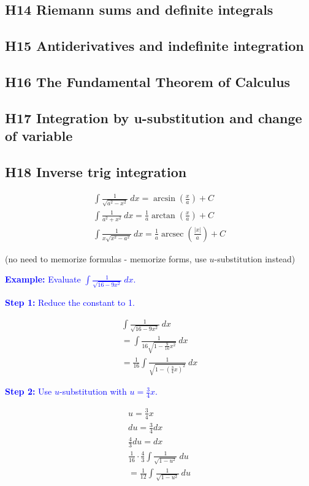 \documentclass[letterpaper, 12pt]{article}
\DeclareMathOperator{\arcsec}{arcsec}
\newcommand{\example}[1]{\textcolor{blue}{\textbf{Example:} #1}}
\newcommand{\step}[2]{\textcolor{blue}{\textbf{Step #1:} #2}}
\begin{document}
\subsection*{H14 Riemann sums and definite integrals}

\subsection*{H15 Antiderivatives and indefinite integration}

\subsection*{H16 The Fundamental Theorem of Calculus}

\subsection*{H17 Integration by u-substitution and change of variable}

\subsection*{H18 Inverse trig integration}

\begin{gather*}
\int \frac{1}{\sqrt{a^2 - x^2}} \: dx = \arcsin \left( \frac{x}{a} \right) + C \\
\int \frac{1}{a^2 + x^2} \: dx = \frac{1}{a} \arctan \left( \frac{x}{a} \right) + C \\
\int \frac{1}{x \sqrt{x^2 - a^2}} \: dx = \frac{1}{a} \arcsec \left( \frac{|x|}{a} \right) + C
\end{gather*}

(no need to memorize formulas - memorize forms, use $u$-substitution instead)

\example{Evaluate $\displaystyle \int \frac{1}{\sqrt{16 - 9x^2}} \: dx$.}

\step{1}{Reduce the constant to 1.}

\begin{gather*}
\int \frac{1}{\sqrt{16 - 9x^2}} \: dx \\
= \int \frac{1}{16\sqrt{1 - \frac{9}{16}x^2}} \: dx \\
= \frac{1}{16} \int \frac{1}{\sqrt{1 - \left(\frac{3}{4}x\right)^2}} \: dx
\end{gather*}

\step{2}{Use $u$-substitution with $u = \frac{3}{4}x$.}

\begin{gather*}
u = \frac{3}{4}x \\
du = \frac{3}{4} dx \\
\frac{4}{3} du = dx \\
\frac{1}{16} \cdot \frac{4}{3} \int \frac{1}{\sqrt{1 - u^2}} \: du \\
= \frac{1}{12} \int \frac{1}{\sqrt{1 - u^2}} \: du
\end{gather*}
\end{document}
